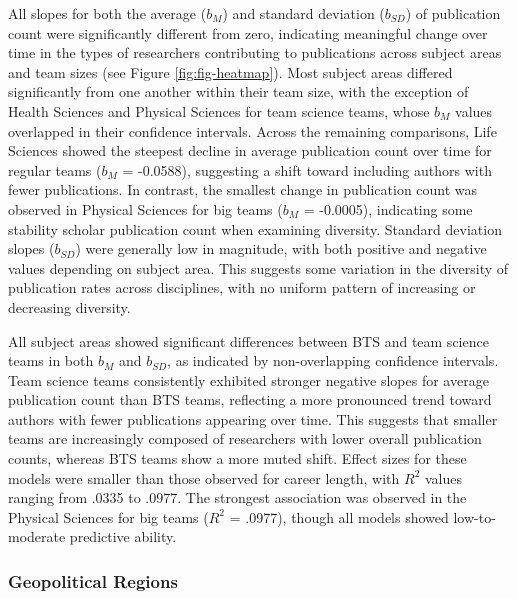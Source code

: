 \documentclass[
  man,floatsintext]{apa7}
\begin{document}
All slopes for both the average (\(b_M\)) and standard deviation
(\(b_{SD}\)) of publication count were significantly different from zero,
indicating meaningful change over time in the types of researchers
contributing to publications across subject areas and team sizes (see
Figure \ref{fig:fig-heatmap}). Most subject areas differed
significantly from one another within their team size, with the
exception of Health Sciences and Physical Sciences for team science
teams, whose \(b_M\) values overlapped in their confidence intervals.
Across the remaining comparisons, Life Sciences showed the steepest
decline in average publication count over time for regular teams (\(b_M\)
= -0.0588), suggesting a shift toward including authors with fewer
publications. In contrast, the smallest change in publication count was
observed in Physical Sciences for big teams (\(b_M\) = -0.0005),
indicating some stability scholar publication count when examining
diversity. Standard deviation slopes (\(b_{SD}\)) were generally low in
magnitude, with both positive and negative values depending on subject
area. This suggests some variation in the diversity of publication rates
across disciplines, with no uniform pattern of increasing or decreasing
diversity.

All subject areas showed significant differences between BTS and team
science teams in both \(b_M\) and \(b_{SD}\), as indicated by
non-overlapping confidence intervals. Team science teams consistently
exhibited stronger negative slopes for average publication count than
BTS teams, reflecting a more pronounced trend toward authors with fewer
publications appearing over time. This suggests that smaller teams are
increasingly composed of researchers with lower overall publication
counts, whereas BTS teams show a more muted shift. Effect sizes for
these models were smaller than those observed for career length, with
\(R^2\) values ranging from .0335 to .0977. The strongest association was
observed in the Physical Sciences for big teams (\(R^2\) = .0977), though
all models showed low-to-moderate predictive ability.

\subsubsection{Geopolitical Regions}\label{geopolitical-regions}
\end{document}
